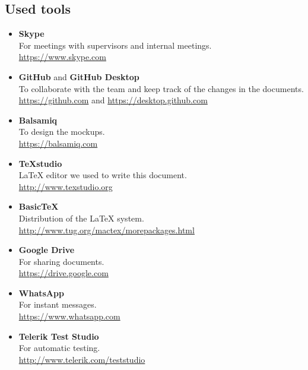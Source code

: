 \subsection{Used tools}
\begin{itemize}
	\item \textbf{Skype} \\
	For meetings with supervisors and internal meetings.\\
	\url{https://www.skype.com}
	\item \textbf{GitHub} and \textbf{GitHub Desktop} \\
	To collaborate with the team and keep track of the changes in the documents. \\
	\url{https://github.com} and \url{https://desktop.github.com}
	\item \textbf{Balsamiq} \\
	To design the mockups. \\
	\url{https://balsamiq.com}
	\item \textbf{TeXstudio} \\
	LaTeX editor we used to write this document. \\
	\url{http://www.texstudio.org}
	\item \textbf{BasicTeX} \\
	Distribution of the LaTeX system. \\
	\url{http://www.tug.org/mactex/morepackages.html}
	\item \textbf{Google Drive} \\
	For sharing documents.\\
	\url{https://drive.google.com}
	\item \textbf{WhatsApp} \\
	For instant messages.\\
	\url{https://www.whatsapp.com}
	\item \textbf{Telerik Test Studio}\\
	For automatic testing.\\
	\url{http://www.telerik.com/teststudio}
\end{itemize}